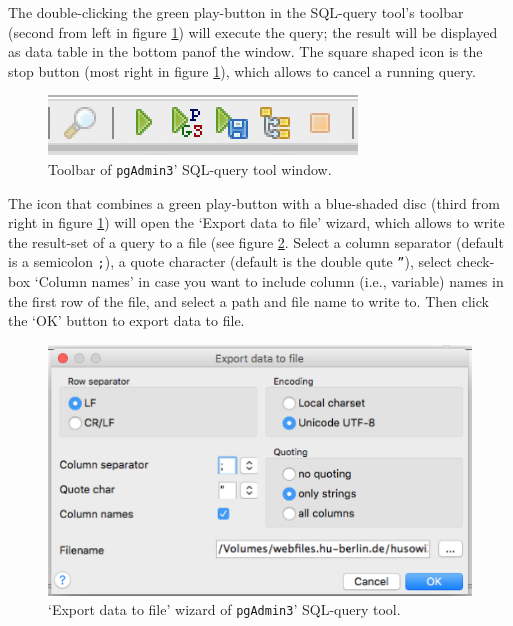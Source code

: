 The double-clicking the green play-button in the SQL-query tool's toolbar (second from left in figure \ref{fig_pgadmin3_sql_query_tool_toolbar}) will execute the query; the result will be displayed as data table in the bottom panof the window.
The square shaped icon is the stop button (most right in figure \ref{fig_pgadmin3_sql_query_tool_toolbar}), which allows to cancel a running query.

\begin{figure}[ht!]
\centering
  \includegraphics[width=.6\textwidth,trim= 0 0 0 0, clip]{pcdb_documentation_screenshots/pgadmin3_sql_query_tool_toolbar.png}
    \caption{Toolbar of \texttt{pgAdmin3}' SQL-query tool window.}
    \label{fig_pgadmin3_sql_query_tool_toolbar}
\end{figure}

The icon that combines a green play-button with a blue-shaded disc (third from right in figure \ref{fig_pgadmin3_sql_query_tool_toolbar}) will open the `Export data to file' wizard, which allows to write the result-set of a query to a file (see figure \ref{fig_pgadmin3_sql_query_tool_export_data_wizard}.
Select a column separator (default is a semicolon \texttt{;}), a quote character (default is the double qute \texttt{''}), select check-box `Column names' in case you want to include column (i.e., variable) names in the first row of the file, and select a path and file name to write to. Then click the `OK' button to export data to file.   

\begin{figure}[ht!]
\centering
  \includegraphics[width=.8\textwidth,trim= 0 0 0 0, clip]{pcdb_documentation_screenshots/pgadmin3_sql_query_tool_export_data_wizard.png}
    \caption{`Export data to file' wizard of \texttt{pgAdmin3}' SQL-query tool.}
    \label{fig_pgadmin3_sql_query_tool_export_data_wizard}
\end{figure}

